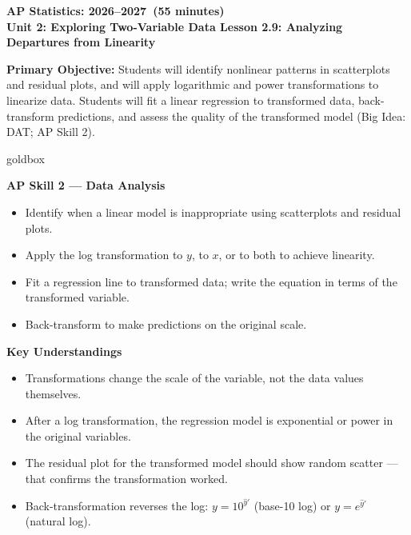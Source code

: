 \documentclass[10pt]{article}
\newcommand{\CourseName}{AP Statistics}
\newcommand{\SchoolYear}{2026--2027}
\newcommand{\MeetingLength}{55 minutes}
\newcommand{\UnitNumberName}{Unit 2: Exploring Two-Variable Data \quad}
\newcommand{\LessonNumberName}{Lesson 2.9: Analyzing Departures from Linearity}
\begin{document}
\begin{center}
    {\Large\bfseries \CourseName: \SchoolYear\ (\MeetingLength) \\
    {\small\bfseries \UnitNumberName \LessonNumberName}}
\end{center}

\begin{tcolorbox}[colback=sky,colframe=navy,boxrule=0.9pt,arc=2mm,
    left=2mm,right=2mm,top=1.5mm,bottom=1.5mm]
    \textbf{Primary Objective:} Students will identify nonlinear patterns in scatterplots and
    residual plots, and will apply logarithmic and power transformations to linearize data.
    Students will fit a linear regression to transformed data, back-transform predictions, and
    assess the quality of the transformed model (Big Idea: DAT; AP Skill 2).
\end{tcolorbox}

\begin{skillbox}{goldbox}
\begin{minipage}[t]{0.48\linewidth}
    \textbf{AP Skill 2 --- Data Analysis}
    \begin{itemize}
        \item Identify when a linear model is inappropriate using scatterplots and residual plots.
        \item Apply the log transformation to $y$, to $x$, or to both to achieve linearity.
        \item Fit a regression line to transformed data; write the equation in terms of the transformed variable.
        \item Back-transform to make predictions on the original scale.
    \end{itemize}
\end{minipage}
\hfill
\begin{minipage}[t]{0.48\linewidth}
    \textbf{Key Understandings}
    \begin{itemize}
        \item Transformations change the scale of the variable, not the data values themselves.
        \item After a log transformation, the regression model is exponential or power in the original variables.
        \item The residual plot for the transformed model should show random scatter --- that confirms the transformation worked.
        \item Back-transformation reverses the log: $y = 10^{\hat{y}'}$ (base-10 log) or $y = e^{\hat{y}'}$ (natural log).
    \end{itemize}
\end{minipage}
\end{skillbox}
\end{document}
